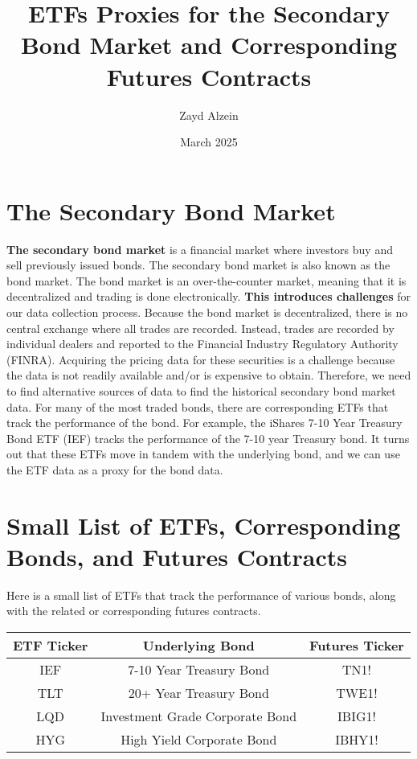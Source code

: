 \documentclass[12pt, letterpaper]{article}
\begin{document}
\title{ETFs Proxies for the Secondary Bond Market and Corresponding Futures Contracts}
\author{Zayd Alzein}
\date{March 2025}

\maketitle %

\section{The Secondary Bond Market}

\textbf{The secondary bond market} is a financial market where investors buy and sell previously issued bonds. 
The secondary bond market is also known as the bond market. The bond market is an over-the-counter market, 
meaning that it is decentralized and trading is done electronically. \textbf{This introduces challenges} for our data collection process.
Because the bond market is decentralized, there is no central exchange where all trades are recorded.
Instead, trades are recorded by individual dealers and reported to the Financial Industry Regulatory Authority (FINRA).
Acquiring the pricing data for these securities is a challenge because the data is not readily available and/or is expensive to obtain.
Therefore, we need to find alternative sources of data to find the historical secondary bond market data.
For many of the most traded bonds, there are corresponding ETFs that track the performance of the bond.
For example, the iShares 7-10 Year Treasury Bond ETF (IEF) tracks the performance of the 7-10 year Treasury bond.
It turns out that these ETFs move in tandem with the underlying bond, and we can use the ETF data as a proxy for the bond data.

\hspace{1cm}

\section{Small List of ETFs, Corresponding Bonds, and Futures Contracts}

Here is a small list of ETFs that track the performance of various bonds, along with the related or corresponding futures contracts.
\begin{table}[h!]
    \centering %
    \begin{tabular}{||c c c||}
        \hline
        ETF Ticker & Underlying Bond & Futures Ticker \\
        \hline
        IEF & 7-10 Year Treasury Bond & TN1! \\
        TLT & 20+ Year Treasury Bond & TWE1! \\
        LQD & Investment Grade Corporate Bond & IBIG1! \\
        HYG & High Yield Corporate Bond & IBHY1! \\
    \end{tabular}
    \label{table:1}

\end{table} %
\end{document}
